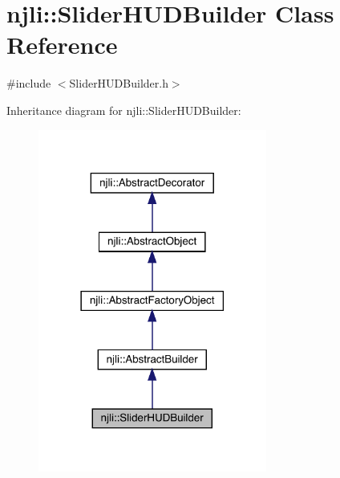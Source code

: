 \hypertarget{classnjli_1_1_slider_h_u_d_builder}{}\section{njli\+:\+:Slider\+H\+U\+D\+Builder Class Reference}
\label{classnjli_1_1_slider_h_u_d_builder}


{\ttfamily \#include $<$Slider\+H\+U\+D\+Builder.\+h$>$}



Inheritance diagram for njli\+:\+:Slider\+H\+U\+D\+Builder\+:\nopagebreak
\begin{figure}[H]
\begin{center}
\leavevmode
\includegraphics[width=213pt]{classnjli_1_1_slider_h_u_d_builder__inherit__graph}
\end{center}
\end{figure}


